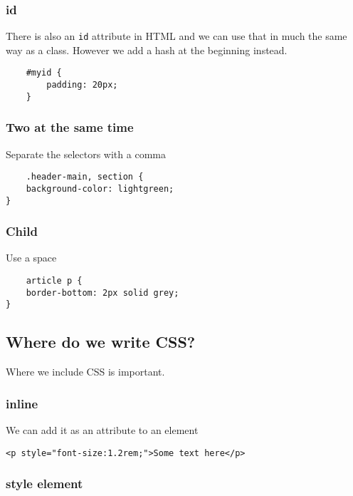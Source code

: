 \subsubsection{id}

There is also an \texttt{id} attribute in HTML and we can use that in much the same way as a class. However we add a hash at the beginning instead.

\begin{verbatim}
    #myid {
        padding: 20px;
    }
\end{verbatim}

\subsubsection{Two at the same time}

Separate the selectors with a comma

\begin{verbatim}
    .header-main, section {
    background-color: lightgreen;
}
\end{verbatim}

\subsubsection{Child}

Use a space

\begin{verbatim}
    article p {
    border-bottom: 2px solid grey;
}
\end{verbatim}


\subsection{Where do we write CSS?}

Where we include CSS is important.

\subsubsection{inline}

We can add it as an attribute to an element

\begin{verbatim}
<p style="font-size:1.2rem;">Some text here</p>
\end{verbatim}

\subsubsection{style element}

